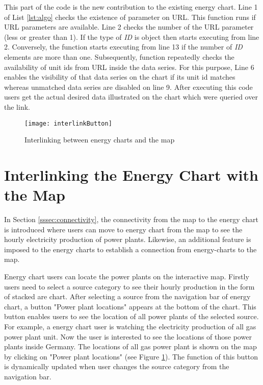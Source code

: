 This part of the code is the new contribution to the existing energy chart. Line 1 of List \ref{lst:algo} checks the existence of parameter on URL. This function runs if URL parameters are available. Line 2 checks the number of the URL parameter (less or greater than 1). If the type of \textit{ID} is object then starts executing from line 2. Conversely, the function starts executing from line 13 if the number of \textit{ID} elements are more than one. Subsequently, function repeatedly checks the availability of unit ids from URL inside the data series. For this purpose, Line 6 enables the visibility of that data series on the chart if its unit id matches whereas unmatched data series are disabled on line 9. After executing this code users get the actual desired data illustrated on the chart which were queried over the link.

\begin{figure} [h]
\centering
\texttt{[image: interlinkButton]}
\caption{Interlinking between energy charts and the map}
\label{fig:interlink}
\end{figure}

\section{Interlinking the Energy Chart with the Map}

In Section \ref{sssec:connectivity}, the connectivity from the map to the energy chart is introduced where users can move to energy chart from the map to see the hourly electricity production of power plants. Likewise, an additional feature is imposed to the energy charts to establish a connection from energy-charts to the map. 

Energy chart users can locate the power plants on the interactive map. Firstly users need to select a source category to see their hourly production in the form of stacked are chart. After selecting a source from the navigation bar of energy chart, a button "Power plant locations" appears at the bottom of the chart. This button enables users to see the location of all power plants of the selected source. For example, a energy chart user is watching the electricity production of all gas power plant unit. Now the user is interested to see the locations of those power plants inside Germany. The locations of all gas power plant is shown on the map by clicking on "Power plant locations" (see Figure \ref{fig:interlink}). The function of this button is dynamically updated when user changes the source category from the navigation bar. 

